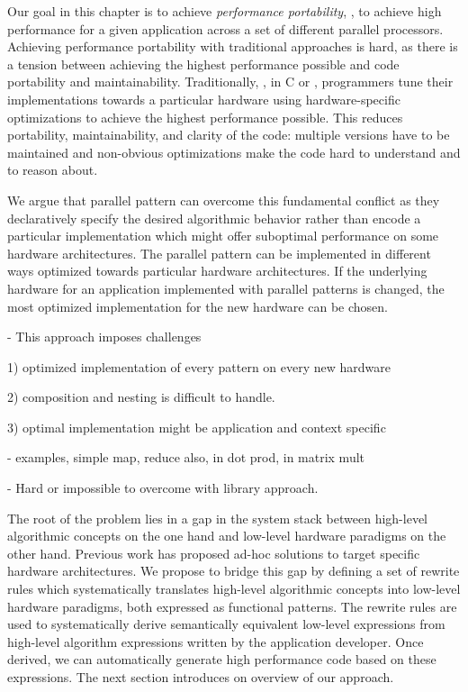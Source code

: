 Our goal in this chapter is to achieve \emph{performance portability}, \ie, to achieve high performance for a given application across a set of different parallel processors.
Achieving performance portability with traditional approaches is hard, as there is a tension between achieving the highest performance possible and code portability and maintainability.
Traditionally, \eg, in C or \OpenCL, programmers tune their implementations towards a particular hardware using hardware-specific optimizations to achieve the highest performance possible.
This reduces portability, maintainability, and clarity of the code:
multiple versions have to be maintained and non-obvious optimizations make the code hard to understand and to reason about.

We argue that parallel pattern can overcome this fundamental conflict as they declaratively specify the desired algorithmic behavior rather than encode a particular implementation which might offer suboptimal performance on some hardware architectures.
The parallel pattern can be implemented in different ways optimized towards particular hardware architectures.
If the underlying hardware for an application implemented with parallel patterns is changed, the most optimized implementation for the new hardware can be chosen.

- This approach imposes challenges

1) optimized implementation of every pattern on every new hardware

2) composition and nesting is difficult to handle.

3) optimal implementation might be application and context specific

- examples, simple map, reduce also, in dot prod, in matrix mult

- Hard or impossible to overcome with library approach.

The root of the problem lies in a gap in the system stack between high-level algorithmic concepts on the one hand and low-level hardware paradigms on the other hand.
Previous work has proposed ad-hoc solutions to target specific hardware architectures.
We propose to bridge this gap by defining a set of rewrite rules which systematically translates high-level algorithmic concepts into low-level hardware paradigms, both expressed as functional patterns.
The rewrite rules are used to systematically derive semantically equivalent low-level expressions from high-level algorithm expressions written by the application developer.
Once derived, we can automatically generate high performance code based on these expressions.
The next section introduces on overview of our approach.
 
